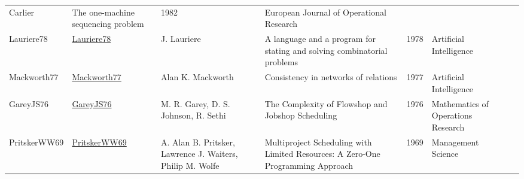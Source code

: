 {\begin{longtable}{p{2cm}p{2cm}p{5cm}p{10cm}rp{3cm}l}
Carlier} & The one-machine sequencing problem & 1982 & European Journal of Operational Research & \cite{Carlier82}\\Lauriere78 & \href{http://dx.doi.org/10.1016/0004-3702(78)90029-2}{Lauriere78} & J. Lauriere & A language and a program for stating and solving combinatorial problems & 1978 & Artificial Intelligence & \cite{Lauriere78}\\Mackworth77 & \href{http://dx.doi.org/10.1016/0004-3702(77)90007-8}{Mackworth77} & Alan K. Mackworth & Consistency in networks of relations & 1977 & Artificial Intelligence & \cite{Mackworth77}\\GareyJS76 & \href{http://dx.doi.org/10.1287/moor.1.2.117}{GareyJS76} & M. R. Garey, D. S. Johnson, R. Sethi & The Complexity of Flowshop and Jobshop Scheduling & 1976 & Mathematics of Operations Research & \cite{GareyJS76}\\PritskerWW69 & \href{http://dx.doi.org/10.1287/mnsc.16.1.93}{PritskerWW69} & A. Alan B. Pritsker, Lawrence J. Waiters, Philip M. Wolfe & Multiproject Scheduling with Limited Resources: A Zero-One Programming Approach & 1969 & Management Science & \cite{PritskerWW69}\\\end{longtable}
}

